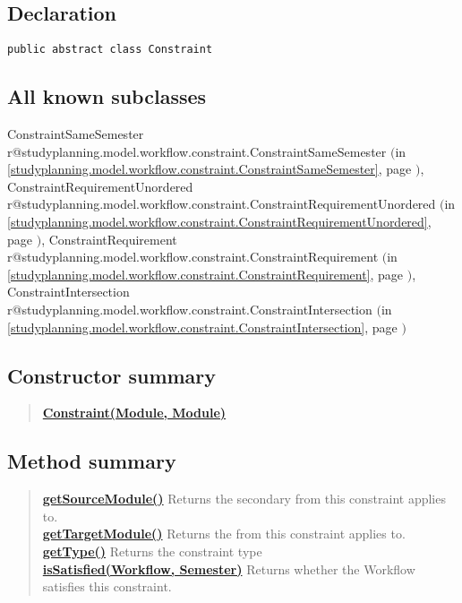 \documentclass[11pt,a4paper]{report}
\makeatletter
\newcommand{\refdefined}[1]{
\expandafter\ifx\csname r@#1\endcsname\relax
\relax\else
{$($in \ref{#1}, page \pageref{#1}$)$}\fi}
\makeatother
\begin{document}
{{{{{{{{{{{			\subsection{Declaration}{
				\begin{lstlisting}[frame=none]
public abstract class Constraint
				\end{lstlisting}
			}
			
			\subsection{All known subclasses}{
			ConstraintSameSemester\small{\refdefined{studyplanning.model.workflow.constraint.ConstraintSameSemester}}, ConstraintRequirementUnordered\small{\refdefined{studyplanning.model.workflow.constraint.ConstraintRequirementUnordered}}, ConstraintRequirement\small{\refdefined{studyplanning.model.workflow.constraint.ConstraintRequirement}}, ConstraintIntersection\small{\refdefined{studyplanning.model.workflow.constraint.ConstraintIntersection}}
			}
			
			\subsection{Constructor summary}{
				\begin{verse}
					\hyperlink{studyplanning.model.workflow.constraint.Constraint(studyplanning.model.workflow.Module, studyplanning.model.workflow.Module)}{{\bf Constraint(Module, Module)}} \\
				\end{verse}	
			}			
			\subsection{Method summary}{
				\begin{verse}
					\hyperlink{studyplanning.model.workflow.constraint.Constraint.getSourceModule()}{{\bf getSourceModule()}} Returns the secondary from this constraint applies to.\\
					\hyperlink{studyplanning.model.workflow.constraint.Constraint.getTargetModule()}{{\bf getTargetModule()}} Returns the from this constraint applies to.\\
					\hyperlink{studyplanning.model.workflow.constraint.Constraint.getType()}{{\bf getType()}} Returns the constraint type\\
					\hyperlink{studyplanning.model.workflow.constraint.Constraint.isSatisfied(studyplanning.model.workflow.Workflow, studyplanning.model.workflow.Semester)}{{\bf isSatisfied(Workflow, Semester)}} Returns whether the Workflow satisfies this constraint.\\
				\end{verse}
			}
			
}}}}}}}}}}}
\end{document}
